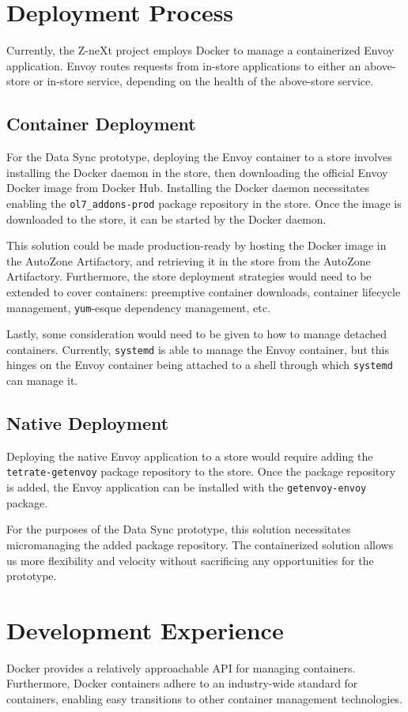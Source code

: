 \documentclass{article}
\begin{document}
\section{Deployment Process}
Currently, the Z-neXt project employs Docker to manage a containerized Envoy application. Envoy routes requests from in-store applications to either an above-store or in-store service, depending on the health of the above-store service.

\subsection{Container Deployment}
For the Data Sync prototype, deploying the Envoy container to a store involves installing the Docker daemon in the store, then downloading the official Envoy Docker image from Docker Hub. Installing the Docker daemon necessitates enabling the \texttt{ol7\_addons-prod} package repository in the store. Once the image is downloaded to the store, it can be started by the Docker daemon.

This solution could be made production-ready by hosting the Docker image in the AutoZone Artifactory, and retrieving it in the store from the AutoZone Artifactory. Furthermore, the store deployment strategies would need to be extended to cover containers: preemptive container downloads, container lifecycle management, \texttt{yum}-esque dependency management, etc.

Lastly, some consideration would need to be given to how to manage detached containers. Currently, \texttt{systemd} is able to manage the Envoy container, but this hinges on the Envoy container being attached to a shell through which \texttt{systemd} can manage it.

\subsection{Native Deployment}
Deploying the native Envoy application to a store would require adding the \texttt{tetrate-getenvoy} package repository to the store. Once the package repository is added, the Envoy application can be installed with the \texttt{getenvoy-envoy} package.

For the purposes of the Data Sync prototype, this solution necessitates micromanaging the added package repository. The containerized solution allows us more flexibility and velocity without sacrificing any opportunities for the prototype.

\section{Development Experience}
Docker provides a relatively approachable API for managing containers. Furthermore, Docker containers adhere to an industry-wide standard for containers, enabling easy transitions to other container management technologies.
\end{document}
